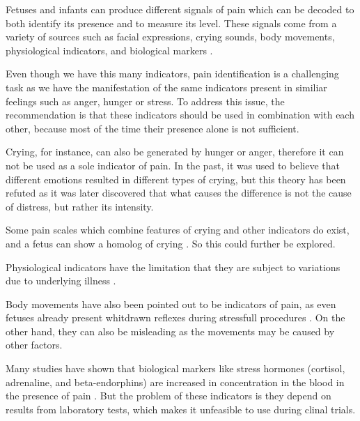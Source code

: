 Fetuses and infants can produce different signals of pain which can be decoded to both identify its presence and to measure its level. These signals come from a variety of sources such as facial expressions, crying sounds, body movements, physiological indicators, and biological markers \citep{Bellieni2012}. 

Even though we have this many indicators, pain identification is a challenging task as we have the manifestation of the same indicators present in similiar feelings such as anger, hunger or stress. To address this issue, the recommendation is that these indicators should be used in combination with each other, because most of the time their presence alone is not sufficient. 

Crying, for instance, can also be generated by hunger or anger, therefore it can not be used as a sole indicator of pain. In the past, it was used to believe that different emotions resulted in different types of crying, but this theory has been refuted as it was later discovered that what causes the difference is not the cause of distress, but rather its intensity. 

Some pain scales which combine features of crying and other indicators do exist, and a fetus can show a homolog of crying \citep{Gingras2005}. So this could further be explored. \cite{abs-1909-02543}


Physiological indicators have the limitation that they are subject to variations due to underlying illness \citep{sweet1998physiological}.

Body movements have also been pointed out to be indicators of pain, as even fetuses already present whitdrawn reflexes during stressfull procedures \citep{Zimmermann1991}. On the other hand, they can also be misleading as the movements may be caused by  other factors. 

Many studies have shown that biological markers like stress hormones (cortisol, adrenaline, and beta-endorphins) are increased in concentration in the blood in the presence of pain \citep{giannakoulopoulos1994fetal}. But the problem of these indicators is they depend on results from laboratory tests, which makes it unfeasible to use during clinal trials.


